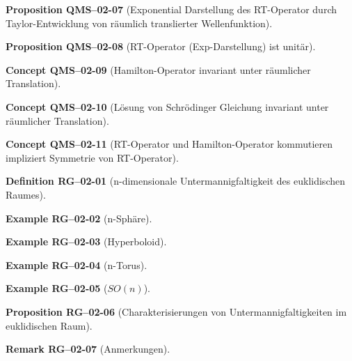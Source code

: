 \documentclass[10pt, letterpaper]{article}
\newcommand{\CustomHeading}[3]{%
  \par\medskip\noindent%
  \textbf{#1 #2} \textnormal{(#3)}.\enskip%
}
\newenvironment{DEF}[2]{\CustomHeading{Definition}{#1}{#2}}{}
\newenvironment{PROP}[2]{\CustomHeading{Proposition}{#1}{#2}}{}
\newenvironment{REM}[2]{\CustomHeading{Remark}{#1}{#2}}{}
\newenvironment{EXA}[2]{\CustomHeading{Example}{#1}{#2}}{}
\newenvironment{CONC}[2]{\CustomHeading{Concept}{#1}{#2}}{}
\begin{document}
\begin{PROP}{QMS--02-07}{Exponential Darstellung des RT-Operator durch Taylor-Entwicklung von räumlich translierter Wellenfunktion}
\end{PROP}

\begin{PROP}{QMS--02-08}{RT-Operator (Exp-Darstellung) ist unitär}
\end{PROP}

\begin{CONC}{QMS--02-09}{Hamilton-Operator invariant unter räumlicher Translation}
\end{CONC}

\begin{CONC}{QMS--02-10}{Lösung von Schrödinger Gleichung invariant unter räumlicher Translation}
\end{CONC}

\begin{CONC}{QMS--02-11}{RT-Operator und Hamilton-Operator kommutieren impliziert Symmetrie von RT-Operator}
\end{CONC}

\begin{DEF}{RG--02-01}{n-dimensionale Untermannigfaltigkeit des euklidischen Raumes}
\end{DEF}

\begin{EXA}{RG--02-02}{n-Sphäre}
\end{EXA}

\begin{EXA}{RG--02-03}{Hyperboloid}
\end{EXA}

\begin{EXA}{RG--02-04}{n-Torus}
\end{EXA}

\begin{EXA}{RG--02-05}{$SO(n)$}
\end{EXA}

\begin{PROP}{RG--02-06}{Charakterisierungen von Untermannigfaltigkeiten im euklidischen Raum}
\end{PROP}

\begin{REM}{RG--02-07}{Anmerkungen}
\end{REM}
\end{document}

